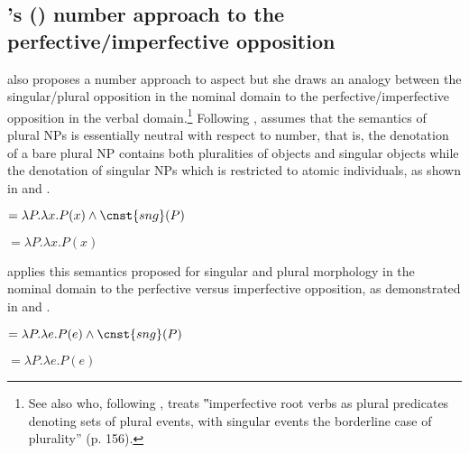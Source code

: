 \documentclass[output=paper]{langscibook}
\begin{document}
\subsection{\citeauthor{Kagan2008}'s (\citeyear{Kagan2008, Kagan2010}) number approach to the perfective/imperfective opposition}\label{jan-bla:fansb:kb:sec4.2}

\citet{Kagan2008, Kagan2010} also proposes a number approach to aspect but she draws an analogy between the singular/plural opposition in the nominal domain to the perfective/imperfective opposition in the verbal domain.\footnote{See also \citet{Rothstein2020} who, following \citet{Kagan2010}, treats ‟imperfective root verbs as plural predicates denoting sets of plural events, with singular events the borderline case of plurality” (p. 156).} Following \citet{Sauerland2003a}, \citet{Kagan2008, Kagan2010} assumes that the semantics of plural NPs is essentially neutral with respect to number, that is, the denotation of a bare plural NP contains both pluralities of objects and singular objects while the denotation of singular NPs which is restricted to atomic individuals, as shown in  and .

\ea {} $= \lambda P. \lambda x.P(x) \wedge \cnst{sng}(P) $\label{jan-bla:fansb:kb:ex13}
\z 

\ea {} $= \lambda P. \lambda x.P(x) $\label{jan-bla:fansb:kb:ex14}
\z 

\noindent \citet{Kagan2008, Kagan2010} applies this semantics proposed for singular and plural morphology in the nominal domain to the perfective versus imperfective opposition, as demonstrated in  and . 

\ea {} $= \lambda P. \lambda e.P(e) \wedge \cnst{sng}(P) $\label{jan-bla:fansb:kb:ex15}
\z 

\ea {} $= \lambda P. \lambda e.P(e) $\label{jan-bla:fansb:kb:ex16}
\z 
\end{document}
